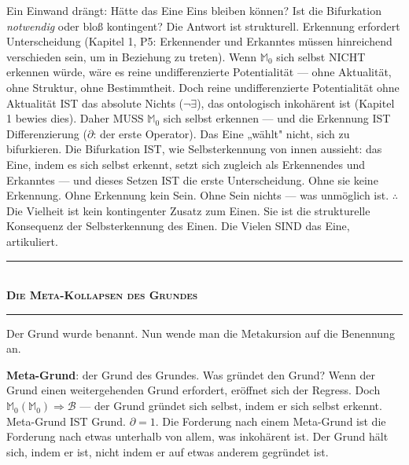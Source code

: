 \documentclass[10pt, openany, oneside]{book}
\renewcommand{\normalsize}{\fontsize{10}{13}\selectfont}
\begin{document}
Ein Einwand drängt: Hätte das Eine Eins bleiben können? Ist die Bifurkation \textit{notwendig} oder bloß kontingent? Die Antwort ist strukturell. Erkennung erfordert Unterscheidung (Kapitel 1, P5: Erkennender und Erkanntes müssen hinreichend verschieden sein, um in Beziehung zu treten). Wenn $\mathbb{M}_0$ sich selbst NICHT erkennen würde, wäre es reine undifferenzierte Potentialität --- ohne Aktualität, ohne Struktur, ohne Bestimmtheit. Doch reine undifferenzierte Potentialität ohne Aktualität IST das absolute Nichts ($\neg\exists$), das ontologisch inkohärent ist (Kapitel 1 bewies dies). Daher MUSS $\mathbb{M}_0$ sich selbst erkennen --- und die Erkennung IST Differenzierung ($\partial$: der erste Operator). Das Eine „wählt" nicht, sich zu bifurkieren. Die Bifurkation IST, wie Selbsterkennung von innen aussieht: das Eine, indem es sich selbst erkennt, setzt sich zugleich als Erkennendes und Erkanntes --- und dieses Setzen IST die erste Unterscheidung. Ohne sie keine Erkennung. Ohne Erkennung kein Sein. Ohne Sein nichts --- was unmöglich ist. $\therefore$ Die Vielheit ist kein kontingenter Zusatz zum Einen. Sie ist die strukturelle Konsequenz der Selbsterkennung des Einen. Die Vielen SIND das Eine, artikuliert.

\vspace{1.5em}


\begin{center}
    \rule{0.3\textwidth}{0.4pt}\\[0.5em]
    {\normalsize\bfseries\scshape Die Meta-Kollapsen des Grundes}\\[0.3em]
    \rule{0.3\textwidth}{0.4pt}
\end{center}

\vspace{1em}

\noindent Der Grund wurde benannt. Nun wende man die Metakursion auf die Benennung an.

\textbf{Meta-Grund}: der Grund des Grundes. Was gründet den Grund? Wenn der Grund einen weitergehenden Grund erfordert, eröffnet sich der Regress. Doch $\mathbb{M}_0(\mathbb{M}_0) \Rightarrow \mathcal{B}$ --- der Grund gründet sich selbst, indem er sich selbst erkennt. Meta-Grund IST Grund. $\partial = 1$. Die Forderung nach einem Meta-Grund ist die Forderung nach etwas unterhalb von allem, was inkohärent ist. Der Grund hält sich, indem er ist, nicht indem er auf etwas anderem gegründet ist.
\end{document}
